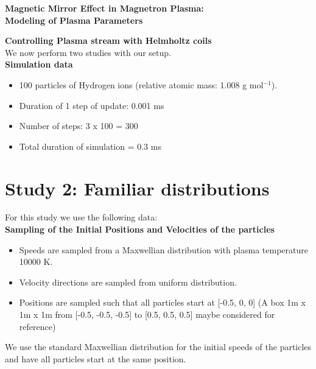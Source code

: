 \documentclass[12pt]{article}
\begin{document}
	\begin{center}
		\Large{\textbf{Magnetic Mirror Effect in Magnetron Plasma:}} \\
		\Large{\textbf{Modeling of Plasma Parameters}}
	\end{center}
	\noindent \Large{\textbf{Controlling Plasma stream with Helmholtz coils}} \normalsize \vspace{0.2cm}\\
	\noindent We now perform two studies with our setup.\\
	\noindent\textbf{Simulation data}
	\begin{itemize}
		\item 100 particles of Hydrogen ions (relative atomic mass: 1.008 g mol$^{-1}$).
		\item Duration of 1 step of update: 0.001 ms
		\item Number of steps: 3 x 100 = 300
		\item Total duration of simulation = 0.3 ms
	\end{itemize}
	\section{Study 2: Familiar distributions}
	For this study we use the following data: \\
	\noindent \textbf{Sampling of the Initial Positions and Velocities of the particles}
	\begin{itemize}
		\item Speeds are sampled from a Maxwellian distribution with plasma temperature 10000 K.
		\item Velocity directions are sampled from uniform distribution.
		\item Positions are sampled such that all particles start at [-0.5, 0, 0] (A box 1m x 1m x 1m from [-0.5, -0.5, -0.5] to	[0.5, 0.5, 0.5] maybe considered for reference)
	\end{itemize}
	\noindent We use the standard Maxwellian distribution for the initial speeds of the particles and have all particles start at the same position.
\end{document}
